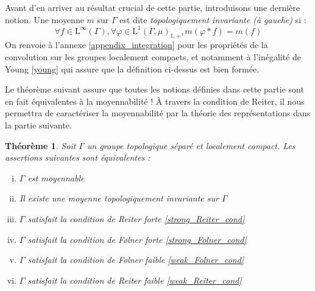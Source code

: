 \documentclass[a4paper,12pt]{article}
\newtheorem{theorem}{Théorème}[section]
\newtheorem{remark}[theorem]{Remarque}
\begin{document}

Avant d'en arriver au résultat crucial de cette partie, introduisons une dernière notion. Une moyenne $m$ sur $\Gamma$ est dite 
\emph{topologiquement invariante (à gauche)} si :
\begin{equation*}
    \forall f\in\mathrm{L}^\infty(\Gamma), \forall\varphi\in\mathrm{L}^1(\Gamma, \mu)_{1, +}, m(\varphi*f) = m(f)
\end{equation*}
On renvoie à l'annexe \ref{appendix_integration} pour les propriétés de la convolution sur les groupes localement
compacts, et notamment à l'inégalité de Young \ref{young} qui assure que la définition ci-dessus est bien formée.

Le théorème suivant assure que toutes les notions définies dans cette partie sont en fait équivalentes à la moyennabilité ! À travers la condition de Reiter, il nous 
permettra de caractériser la moyennabilité par la théorie des représentations dans la partie suivante.

\begin{theorem}\label{amenable_TFAE}
    Soit $\Gamma$ un groupe topologique séparé et localement compact. Les assertions suivantes sont équivalentes :
    \begin{enumerate}[(i)]
        \item $\Gamma$ est moyennable \label{amenable_TFAE/amenable}
        \item Il existe une moyenne topologiquement invariante sur $\Gamma$ \label{amenable_TFAE/topological_mean}
        \item $\Gamma$ satisfait la condition de Reiter forte \label{amenable_TFAE/strong_Reiter} \eqref{strong_Reiter_cond}
        \item $\Gamma$ satisfait la condition de F\o{}lner forte \label{amenable_TFAE/strong_Folner} \eqref{strong_Folner_cond}
        \item $\Gamma$ satisfait la condition de F\o{}lner faible \label{amenable_TFAE/weak_Folner} \eqref{weak_Folner_cond}
        \item $\Gamma$ satisfait la condition de Reiter faible \label{amenable_TFAE/weak_Reiter} \eqref{weak_Reiter_cond}
    \end{enumerate}
\end{theorem}
\end{document}
